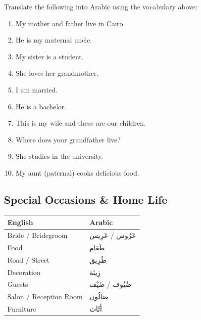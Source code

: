 \documentclass[
  a4paper,
  DIV=11,
  numbers=noendperiod]{scrartcl}
\providecommand{\tightlist}{%
  \setlength{\itemsep}{0pt}\setlength{\parskip}{0pt}}
\begin{document}
\begin{tcolorbox}[enhanced jigsaw, bottomrule=.15mm, arc=.35mm, colbacktitle=quarto-callout-note-color!10!white, opacityback=0, toptitle=1mm, title=\textcolor{quarto-callout-note-color}{\faInfo}\hspace{0.5em}{Try This!}, colframe=quarto-callout-note-color-frame, opacitybacktitle=0.6, colback=white, coltitle=black, titlerule=0mm, left=2mm, toprule=.15mm, bottomtitle=1mm, rightrule=.15mm, leftrule=.75mm, breakable]

Translate the following into Arabic using the vocabulary above:

\begin{enumerate}
\def\labelenumi{\arabic{enumi}.}
\tightlist
\item
  My mother and father live in Cairo.
\item
  He is my maternal uncle.
\item
  My sister is a student.
\item
  She loves her grandmother.
\item
  I am married.
\item
  He is a bachelor.
\item
  This is my wife and these are our children.
\item
  Where does your grandfather live?
\item
  She studies in the university.
\item
  My aunt (paternal) cooks delicious food.
\end{enumerate}

\end{tcolorbox}

\subsection{Special Occasions \& Home
Life}\label{special-occasions-home-life}

\begin{longtable}[]{@{}ll@{}}
\toprule\noalign{}
English & Arabic \\
\midrule\noalign{}
\endhead
\bottomrule\noalign{}
\endlastfoot
Bride / Bridegroom & عَرُوس / عَرِيس \\
Food & طَعَام \\
Road / Street & طَرِيق \\
Decoration & زِينَة \\
Guests & ضُيُوف / ضَيْف \\
Salon / Reception Room & صَالُون \\
Furniture & أَثَاث \\
\end{longtable}
\end{document}
